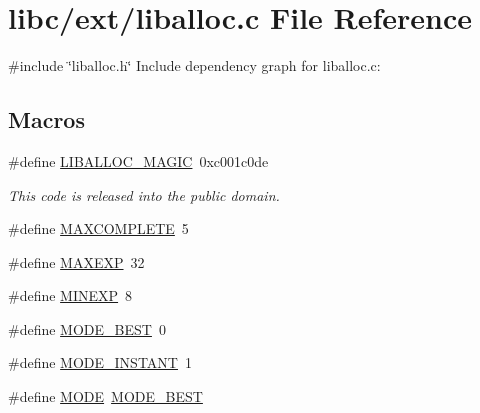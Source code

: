 \hypertarget{a00023}{}\section{libc/ext/liballoc.c File Reference}
\label{a00023}
{\ttfamily \#include \char`\"{}liballoc.\+h\char`\"{}}\newline
Include dependency graph for liballoc.\+c\+:
\subsection*{Macros}
\begin{DoxyCompactItemize}
\item 
\#define \hyperlink{a00023_af6b1d459ffa3c81e2456acf8d4268330_af6b1d459ffa3c81e2456acf8d4268330}{L\+I\+B\+A\+L\+L\+O\+C\+\_\+\+M\+A\+G\+IC}~0xc001c0de
\begin{DoxyCompactList}\small\item\em This code is released into the public domain. \end{DoxyCompactList}\item 
\#define \hyperlink{a00023_a08b7f1e029a0c835f3639557d8ad7a36_a08b7f1e029a0c835f3639557d8ad7a36}{M\+A\+X\+C\+O\+M\+P\+L\+E\+TE}~5
\item 
\#define \hyperlink{a00023_af823bb7d083fafbd662be7ea09582013_af823bb7d083fafbd662be7ea09582013}{M\+A\+X\+E\+XP}~32
\item 
\#define \hyperlink{a00023_ae7249b0af4d1bfe02a4c7bdbf810bd8c_ae7249b0af4d1bfe02a4c7bdbf810bd8c}{M\+I\+N\+E\+XP}~8
\item 
\#define \hyperlink{a00023_a881288ad0450ab9858bf01b030e755b0_a881288ad0450ab9858bf01b030e755b0}{M\+O\+D\+E\+\_\+\+B\+E\+ST}~0
\item 
\#define \hyperlink{a00023_aedc513524290b468e893e1bc4f5cba2f_aedc513524290b468e893e1bc4f5cba2f}{M\+O\+D\+E\+\_\+\+I\+N\+S\+T\+A\+NT}~1
\item 
\#define \hyperlink{a00023_ab8c52c1b4c021ed3e6b6b677bd2ac019_ab8c52c1b4c021ed3e6b6b677bd2ac019}{M\+O\+DE}~\hyperlink{a00023_a881288ad0450ab9858bf01b030e755b0_a881288ad0450ab9858bf01b030e755b0}{M\+O\+D\+E\+\_\+\+B\+E\+ST}
\end{DoxyCompactItemize}

